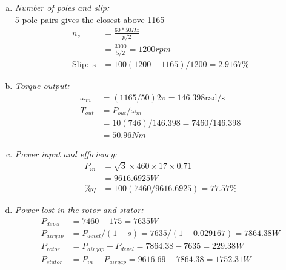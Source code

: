 \documentclass[a4paper,11pt]{article}
\begin{document}
\begin{enumerate}[a)]
    \item \textit{Number of poles and slip:}\\
          5 pole pairs gives the closest above 1165
          \begin{align*}
              n_s               & =\frac{60*50Hz}{p/2}          \\
                                & =\frac{3000}{5/2} = 1200rpm   \\
              \mathrm{Slip:\;s} & =100(1200-1165)/1200=2.9167\%
          \end{align*}

    \item \textit{Torque output:}\\
          \begin{align*}
              \omega_m & = (1165/50)2\pi = 146.398 \mathrm{rad/s} \\
              T_{out}  & = P_{out}/\omega_m                       \\
                       & = 10(746)/146.398=7460/146.398
              \\&=50.96Nm
          \end{align*}

    \item \textit{Power input and efficiency:}\\
          \begin{align*}
              P_{in} & = \sqrt{3}\times460\times17\times0.71 \\
                     & =9616.6925W                           \\
              \%\eta & = 100(7460/9616.6925)=77.57\%
          \end{align*}

    \item \textit{Power lost in the rotor and stator:}\\
          \begin{align*}
              P_{devel}  & = 7460+175=7635W                               \\
              P_{airgap} & = P_{devel}/(1-s) = 7635/(1-0.029167)=7864.38W \\
              P_{rotor}  & = P_{airgap}-P_{devel} = 7864.38-7635=229.38W  \\
              P_{stator} & = P_{in}-P_{airgap}=9616.69-7864.38=1752.31W
          \end{align*}
\end{enumerate}
\end{document}
